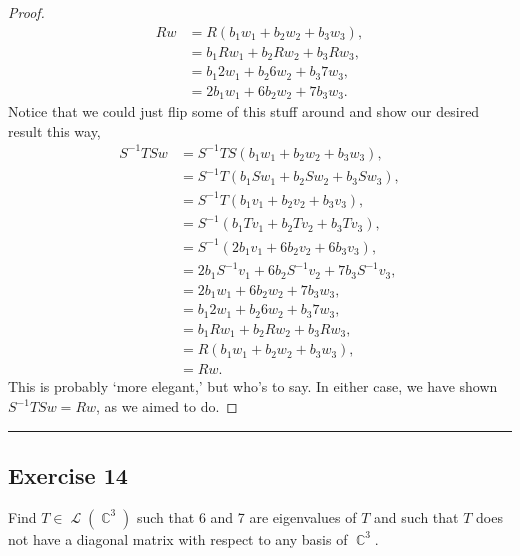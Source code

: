 \documentclass[letterpaper, 12pt]{amsart}
\DeclareMathOperator{\C}{\mathbb{C}}				%
\DeclareMathOperator{\Ell}{\mathscr{L}}				%
\theoremstyle{definition}  							%
\begin{document}
\begin{proof}
\begin{align*}
				Rw &= R(b_{1}w_{1} + b_{2}w_{2} + b_{3}w_{3}), \\
				&= b_{1}Rw_{1} + b_{2}Rw_{2} + b_{3}Rw_{3}, \\
				&= b_{1}2w_{1} + b_{2}6w_{2} + b_{3}7w_{3}, \\
				&= 2b_{1}w_{1} + 6b_{2}w_{2} + 7b_{3}w_{3}.
			\end{align*}
		Notice that we could just flip some of this stuff around and show our desired result this way,
			\begin{align*}
				S^{-1}TSw &= S^{-1}TS(b_{1}w_{1} + b_{2}w_{2} + b_{3}w_{3}), \\
				&= S^{-1} T(b_{1}Sw_{1} + b_{2}Sw_{2} + b_{3}Sw_{3}), \\
				&= S^{-1} T(b_{1}v_{1} + b_{2}v_{2} + b_{3}v_{3}), \\
				&= S^{-1}(b_{1}Tv_{1} + b_{2}Tv_{2} + b_{3}Tv_{3}), \\
				&= S^{-1}(2b_{1}v_{1} + 6b_{2}v_{2} + 6b_{3}v_{3}), \\
				&= 2b_{1}S^{-1}v_{1} + 6b_{2}S^{-1}v_{2} + 7b_{3}S^{-1}v_{3}, \\
				&= 2b_{1}w_{1} + 6b_{2}w_{2} + 7b_{3}w_{3}, \\
				&= b_{1}2w_{1} + b_{2}6w_{2} + b_{3}7w_{3}, \\
				&= b_{1}Rw_{1} + b_{2}Rw_{2} + b_{3}Rw_{3}, \\
				&= R(b_{1}w_{1} + b_{2}w_{2} + b_{3}w_{3}), \\
				&= Rw.
			\end{align*}
		This is probably `more elegant,' but who's to say.
		In either case, we have shown $S^{-1}TSw = Rw$, as we aimed to do.
		\end{proof}

		\vspace*{2mm}
		\hrule
		\vspace*{2mm}

		\subsection*{Exercise 14}
		Find $T \in \Ell(\C^{3})$ such that 6 and 7 are eigenvalues of $T$ and such that $T$ does not have a diagonal matrix with respect to any basis of $\C^{3}$.
		\vspace*{3mm}
\end{document}
